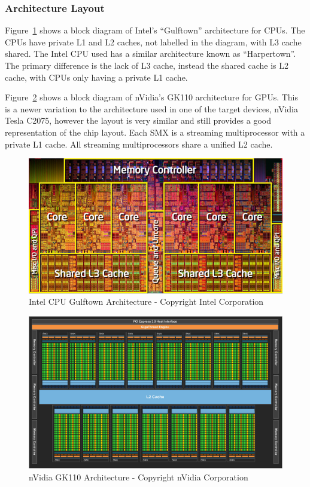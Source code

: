 \subsubsection{Architecture Layout}

Figure~\ref{fig:gulftownArchitecture} shows a block diagram of Intel's ``Gulftown''
architecture for CPUs. The CPUs have private L1 and L2 caches, not labelled in
the diagram, with L3 cache shared. The Intel CPU used has a similar architecture
known as ``Harpertown''. The primary difference is the lack of L3 cache, instead
the shared cache is L2 cache, with CPUs only having a private L1 cache.

Figure~\ref{fig:gk110Architecture} shows a block diagram of nVidia's GK110
architecture for GPUs. This is a newer variation to the architecture used in one
of the target devices, nVidia Tesla C2075, however the layout is very similar
and still provides a good representation of the chip layout. Each SMX is a
streaming multiprocessor with a private L1 cache. All streaming multiprocessors
share a unified L2 cache.

\begin{figure}[H]
\centering
\includegraphics[width=0.9\linewidth]{images/gulftownArchitecture.jpg}
\caption{Intel CPU Gulftown Architecture - Copyright Intel Corporation \textcopyright}
\label{fig:gulftownArchitecture}
\end{figure}

\begin{figure}[H]
\centering
\includegraphics[width=0.9\linewidth]{images/gk110Architecture.jpg}
\caption{nVidia GK110 Architecture - Copyright nVidia Corporation \textcopyright}
\label{fig:gk110Architecture}
\end{figure}


